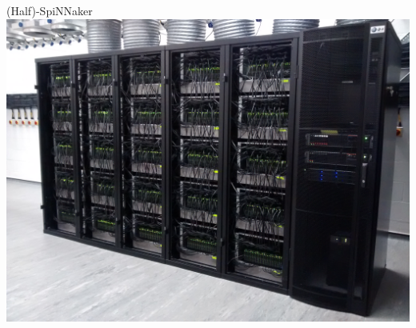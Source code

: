 \documentclass[t]{beamer}
\begin{document}
\begin{darkframes}
  \begin{frame}[c]{(Half)-SpiNNaker}
    \includegraphics[width=\textwidth]{SpiNNaker}
  \end{frame}
\end{darkframes}
\end{document}
